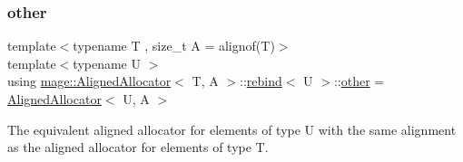 \subsubsection{\texorpdfstring{other}{other}}
{\footnotesize\ttfamily template$<$typename T , size\+\_\+t A = alignof(\+T)$>$ \\
template$<$typename U $>$ \\
using \mbox{\hyperlink{classmage_1_1_aligned_allocator}{mage\+::\+Aligned\+Allocator}}$<$ T, A $>$\+::\mbox{\hyperlink{structmage_1_1_aligned_allocator_1_1rebind}{rebind}}$<$ U $>$\+::\mbox{\hyperlink{structmage_1_1_aligned_allocator_1_1rebind_a12f5ac277f4ef4993d1f73eba91c3439}{other}} =  \mbox{\hyperlink{classmage_1_1_aligned_allocator}{Aligned\+Allocator}}$<$ U, A $>$}

The equivalent aligned allocator for elements of type {\ttfamily U} with the same alignment as the aligned allocator for elements of type {\ttfamily T}. 